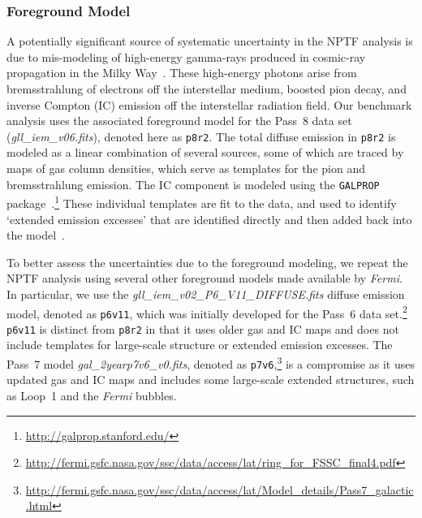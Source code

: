 \subsubsection{Foreground Model}
\label{sec:foreground}

A potentially significant source of systematic uncertainty in the NPTF analysis is due to mis-modeling of high-energy gamma-rays produced in cosmic-ray propagation in the Milky Way~\cite{Ackermann:2012pya}.  These high-energy photons arise from  bremsstrahlung of electrons off the interstellar medium, boosted pion decay, and inverse Compton (IC)  emission off the interstellar radiation field.  Our benchmark analysis uses 
the associated foreground model for the Pass~8 data set (\emph{gll\_iem\_v06.fits}), denoted here as \texttt{p8r2}.  The total diffuse emission in \texttt{p8r2} is modeled as a linear combination of several sources, some of which are traced by maps of gas column densities, which serve as templates for the pion and bremsstrahlung emission.  The IC component is modeled using the \texttt{GALPROP} package~\cite{Strong:2007nh}.\footnote{\url{http://galprop.stanford.edu/}}  These individual templates are fit to the data, and used to identify `extended emission excesses' that are identified directly and then added back into the model~\cite{Acero-2016}.

To better assess the uncertainties due to the foreground modeling, we repeat the NPTF analysis using several other foreground models made available by \emph{Fermi}.  In particular, we use the \emph{gll\_iem\_v02\_P6\_V11\_DIFFUSE.fits} diffuse emission model, denoted as \texttt{p6v11}, which was initially developed for the Pass~6 data set.\footnote{\url{http://fermi.gsfc.nasa.gov/ssc/data/access/lat/ring_for_FSSC_final4.pdf}}  \texttt{p6v11} is distinct from \texttt{p8r2} in that it uses older gas and IC maps and does not include templates for large-scale structure or extended emission excesses.  The Pass~7 model \emph{gal\_2yearp7v6\_v0.fits}, denoted as \texttt{p7v6},\footnote{\url{http://fermi.gsfc.nasa.gov/ssc/data/access/lat/Model_details/Pass7_galactic.html}} is a compromise as it uses updated gas and IC maps and includes some large-scale extended structures, such as Loop~1 and the \emph{Fermi} bubbles.

